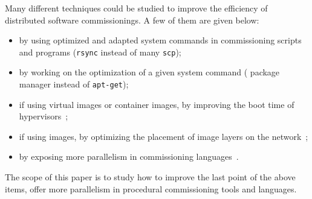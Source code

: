 Many different techniques could be studied to improve the efficiency
of distributed software commissionings. A few of them are given below:
\begin{itemize}
\item by using optimized and adapted system commands in commissioning
  scripts and programs (\eg \texttt{rsync} instead of many
  \texttt{scp});
\item by working on the optimization of a given system command (\eg
  \nix package manager instead of \texttt{apt-get});
\item if using virtual images or container images, by improving the
  boot time of hypervisors~\cite{nguyen:hal-02172288};
\item if using \docker images, by optimizing the placement of image
  layers on the network~\cite{darrous:hal-01745405};
\item by exposing more parallelism in commissioning
  languages~\cite{dicosmo:hal-01233489}.
\end{itemize}

\begin{tcolorbox}[enhanced,attach boxed title to top left={yshift=-3mm,yshifttext=-1mm},
  colback=black!5!white,colframe=black!30,colbacktitle=black!60,
  title=Scope,fonttitle=\bfseries,
  boxed title style={size=small,colframe=black!60,boxrule=0.2mm},
  boxrule=0.2mm]
  The scope of this paper is to study how to improve the last point of
  the above items, \ie offer more parallelism in procedural
  commissioning tools and languages.
\end{tcolorbox}
